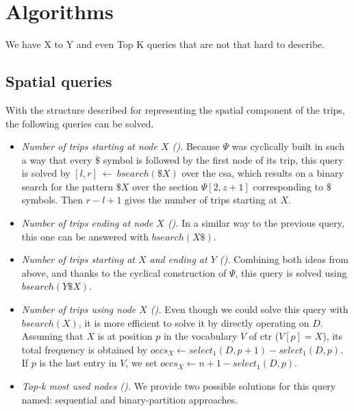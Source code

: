\section{Algorithms}
	We have X to Y and even Top K queries that are not that hard to describe.

	\subsection{Spatial queries}
	\label{sec:sq}

	With the structure described for representing the spatial component of the trips,
	the following queries can be solved.

	\begin{itemize}[leftmargin=3mm]
	\setlength{\itemindent}{0mm}
	\item {\em Number of trips starting at node $X$ (\Sswx).}
	Because $\Psi$ was cyclically built in such a way that every $\$$ symbol is followed by the first node 
	of its trip, this query is solved by $[l,r]~\leftarrow~bsearch(\$X)$ over the \gls{csa}, 
	which results on a binary search for the pattern $\$X$ over the section $\Psi[2,z+1]$ corresponding to $\$$ symbols. 
	Then $r-l+1$ gives the number of trips starting at $X$.

	\item {\em Number of trips ending at node $X$ (\Sewx).} In a similar way to the previous query, 
	this one can be answered with $bsearch(X\$)$.

	\item {\em Number of trips starting at $X$ and ending at $Y$ (\Sfxty).}
	Combining both ideas from above, and thanks to the cyclical construction of $\Psi$, this query is solved 
	using $bsearch(Y\$X)$.

	\item {\em Number of trips using node $X$ (\Sux).}
	Even though we could solve this query with $bsearch(X)$, it is more efficient to solve it by directly operating on $D$. 
	 Assuming that $X$ is
	at position $p$ in the vocabulary $V$ of  \gls{ctr} ($V[p]=X$), its total frequency is obtained by
	$occs_X \leftarrow select_1(D,p+1) - select_1(D,p)$. %
	If $p$ is the last entry in $V$, we set $occs_X \leftarrow n+1-select_1(D,p)$.

	\setlength{\itemindent}{0mm}
	\item {\em Top-k most used nodes (\Stk).}
	We provide two possible solutions for this query named: %
	sequential and binary-partition approaches. 


\end{itemize}
